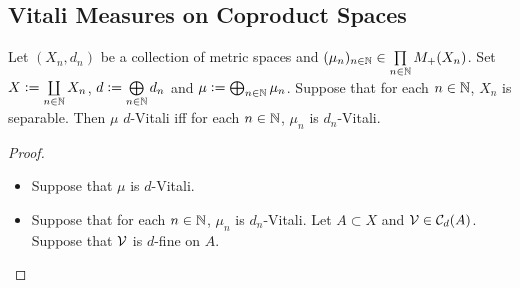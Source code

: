 \documentclass{book}
\begin{document}
	
	
	
	
	
	
	
	
	
	
	
	
	
	
	
	
	
	
	
	
	
	
	
	
	
	
	
	
	
	
	
	
	
	
	
	
	
	
	
	
	
	
	
	
	
	
	
	
	
	
	
	
	
	
	
	
	
	
	
	
	
	
	\subsection{Vitali Measures on Coproduct Spaces}
	
	\begin{ex} 
		Let $(X_n, d_n)$ be a collection of metric spaces and $(\mu_n)_{n \in \mathbb{N}} \in \prod\limits_{n \in \mathbb{N}} M_+(X_n)$. Set $X \vcentcolon= \coprod\limits_{n \in \mathbb{N}} X_n$, $d \vcentcolon= \bigoplus\limits_{n \in \mathbb{N}} d_n$ and $\mu \vcentcolon= \bigoplus_{n \in \mathbb{N}} \mu_n$.  Suppose that for each $n \in \mathbb{N}$, $X_n$ is separable. Then $\mu$ $d$-Vitali iff for each $n \in \mathbb{N}$, $\mu_n$ is $d_n$-Vitali.
	\end{ex}
	
	\begin{proof}\
		\begin{itemize}
			\item Suppose that $\mu$ is $d$-Vitali.
			\item Suppose that for each $n \in \mathbb{N}$, $\mu_n$ is $d_n$-Vitali. Let $A \subset X$ and $\mathcal{V} \in \mathcal{C}_d(A)$. Suppose that $\mathcal{V}$ is $d$-fine on $A$. \tcr{} 
		\end{itemize}
	\end{proof}
	
\end{document}
